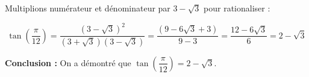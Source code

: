 \documentclass[a4paper,12pt]{article}
\begin{document}
\begin{solutionbox}
\begin{enumerate}
    Multiplions numérateur et dénominateur par \( 3 - \sqrt{3} \) pour rationaliser :

    \[
    \tan \left( \dfrac{\pi}{12} \right) = \dfrac{ (3 - \sqrt{3})^2 }{ (3 + \sqrt{3})(3 - \sqrt{3}) } = \dfrac{ (9 - 6\sqrt{3} + 3) }{ 9 - 3 } = \dfrac{ 12 - 6\sqrt{3} }{6} = 2 - \sqrt{3}
    \]

    \textbf{Conclusion :} On a démontré que \( \tan\left( \dfrac{\pi}{12} \right) = 2 - \sqrt{3} \).

\end{enumerate}
\end{solutionbox}

%
%
\end{document}
